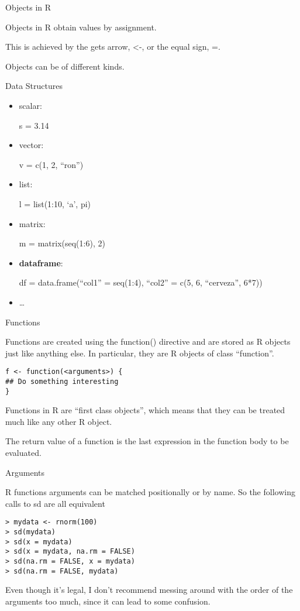 \begin{frame}{Objects in R}

Objects in R obtain values by assignment.

This is achieved by the gets arrow, \textless{}-, or the equal sign, =.

Objects can be of different kinds.

\end{frame}

\begin{frame}{Data Structures}

\begin{itemize}
\item
  scalar:

  s = 3.14
\item
  vector:

  v = c(1, 2, ``ron'')
\item
  list:

  l = list(1:10, `a', pi)
\item
  matrix:

  m = matrix(seq(1:6), 2)
\item
  \textbf{dataframe}:

  df = data.frame(``col1'' = seq(1:4), ``col2'' = c(5, 6, ``cerveza'',
  6*7))
\item
  \ldots{}
\end{itemize}

\end{frame}

\begin{frame}[fragile]{Functions}

Functions are created using the function() directive and are stored as R
objects just like anything else. In particular, they are R objects of
class ``function''.

\begin{verbatim}
f <- function(<arguments>) {
## Do something interesting
}
\end{verbatim}

Functions in R are ``first class objects'', which means that they can be
treated much like any other R object.

The return value of a function is the last expression in the function
body to be evaluated.

\end{frame}

\begin{frame}[fragile]{Arguments}

R functions arguments can be matched positionally or by name. So the
following calls to sd are all equivalent

\begin{verbatim}
> mydata <- rnorm(100)
> sd(mydata)
> sd(x = mydata)
> sd(x = mydata, na.rm = FALSE)
> sd(na.rm = FALSE, x = mydata)
> sd(na.rm = FALSE, mydata)
\end{verbatim}

Even though it's legal, I don't recommend messing around with the order
of the arguments too much, since it can lead to some confusion.

\end{frame}

